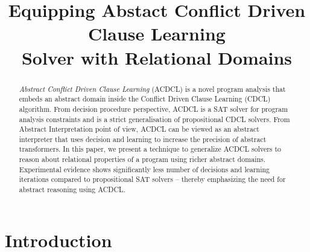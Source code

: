 \documentclass[a4paper,conference]{llncs}
\begin{document}
\title{Equipping Abstact Conflict Driven Clause Learning \\ Solver with Relational Domains}
\maketitle
\begin{abstract}
%
{\em Abstract Conflict Driven Clause Learning} (ACDCL) is a novel program analysis that embeds an 
abstract domain inside the Conflict Driven Clause Learning (CDCL) algorithm. From decision procedure 
perspective, ACDCL is a SAT solver for program analysis constraints and is a strict generalisation of 
propositional CDCL solvers. From Abstract Interpretation point of view, ACDCL can be viewed as an 
abstract interpreter that uses decision and learning to increase the precision of abstract transformers. 
In this paper, we present a technique to generalize ACDCL solvers to reason about relational properties 
of a program using richer abstract domains.  Experimental evidence shows significantly less number of 
decisions and learning iterations compared to propositional SAT solvers -- thereby emphasizing the need
for abstract reasoning using ACDCL. 

%
\end{abstract}

\section{Introduction}
\end{document}
